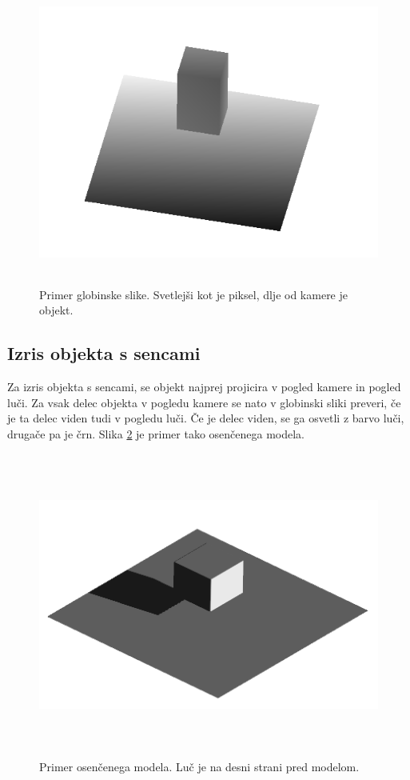 \documentclass[a4paper, 12pt]{book}
\begin{document}
\begin{figure}[h]
\begin{center}
\includegraphics[width=12cm, height=10cm, keepaspectratio=true]{Globinska_slika.png}
\end{center}
\caption{Primer globinske slike. Svetlejši kot je piksel, dlje od kamere je objekt.}
\label{globinskaslika}
\end{figure}

\subsection*{Izris objekta s sencami}
Za izris objekta s sencami, se objekt najprej projicira v pogled kamere in pogled luči. Za vsak delec objekta v pogledu kamere se nato v globinski sliki preveri, če je ta delec viden tudi v pogledu luči. Če je delec viden, se ga osvetli z barvo luči, drugače pa je črn. Slika \ref{osencenmodel} je primer tako osenčenega modela.

\begin{figure}[h]
\begin{center}
\includegraphics[width=12cm, height=10cm, keepaspectratio=true]{Osencen_model.png}
\end{center}
\caption{Primer osenčenega modela. Luč je na desni strani pred modelom.}
\label{osencenmodel}
\end{figure}
\end{document}
